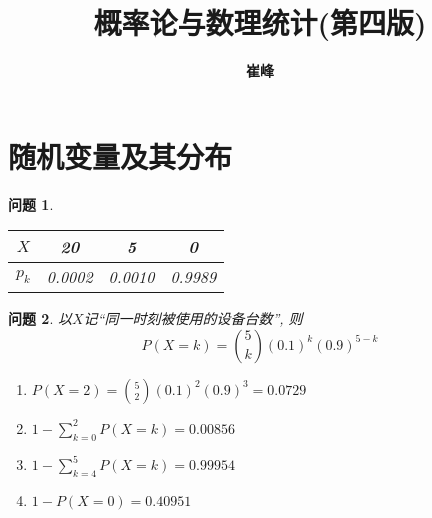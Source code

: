 \documentclass[a4paper]{article}
\theoremstyle{mystyle}
\newtheorem{prob}{问题}[section]
\begin{document}
	\title{\huge \bf 概率论与数理统计(第四版)}
	\author{\bf 崔峰}
	\maketitle
	\setcounter{section}{1}
	\section{随机变量及其分布}
	\begin{prob}
		\begin{tabular}{c|ccc}
		$X$ & 20 & 5 & 0\\
		\hline
		$p_k$ & 0.0002 & 0.0010 & 0.9989
		\end{tabular}
	\end{prob}
	\setcounter{prob}{5}
	\begin{prob}
		以$X$记``同一时刻被使用的设备台数'', 则
		\[
			P(X=k)={5\choose k}(0.1)^k(0.9)^{5-k}
		\]
		\begin{enumerate}[{(}1{)}]
			\item
			$\displaystyle P(X=2)={5\choose 2}(0.1)^2(0.9)^{3}=0.0729$
			\item
			$\displaystyle 1-\sum_{k=0}^2P(X=k)=0.00856$
			\item
			$\displaystyle 1-\sum_{k=4}^5 P(X=k)=0.99954$
			\item
			$\displaystyle 1-P(X=0)=0.40951$
		\end{enumerate}
	\end{prob}
\end{document}
